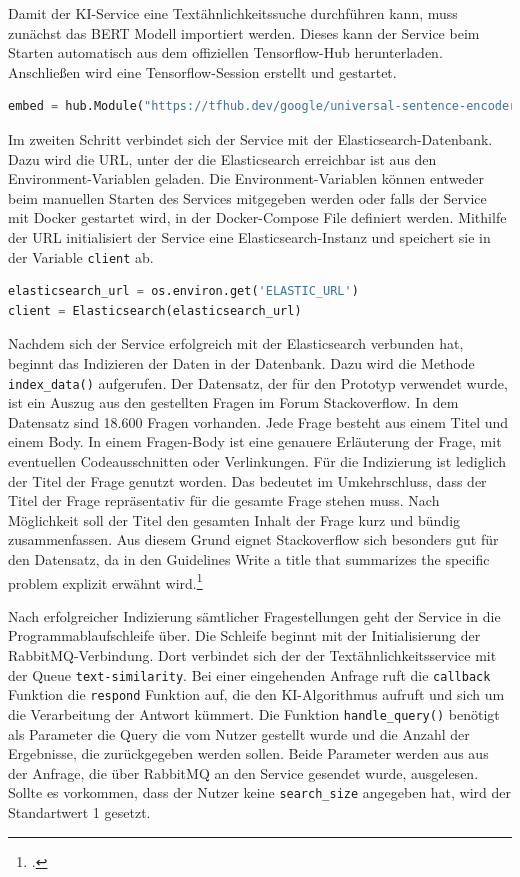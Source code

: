 Damit der KI-Service eine Textähnlichkeitssuche durchführen kann, muss zunächst das BERT Modell importiert werden. Dieses kann der Service beim Starten automatisch aus dem offiziellen Tensorflow-Hub herunterladen. Anschließen wird eine Tensorflow-Session erstellt und gestartet. 

\begin{lstlisting}[language=Python, caption={Laden des BERT-Modells}]
embed = hub.Module("https://tfhub.dev/google/universal-sentence-encoder/2")
\end{lstlisting}

Im zweiten Schritt verbindet sich der Service mit der Elasticsearch-Datenbank. Dazu wird die URL, unter der die Elasticsearch erreichbar ist aus den Environment-Variablen geladen. Die Environment-Variablen können entweder beim manuellen Starten des Services mitgegeben werden oder falls der Service mit Docker gestartet wird, in der Docker-Compose File definiert werden. Mithilfe der URL initialisiert der Service eine Elasticsearch-Instanz und speichert sie in der Variable \texttt{client} ab. 

\begin{lstlisting}[language=Python, caption={Starten der Elasticsearch-Instanz}]
elasticsearch_url = os.environ.get('ELASTIC_URL')
client = Elasticsearch(elasticsearch_url)
\end{lstlisting}

Nachdem sich der Service erfolgreich mit der Elasticsearch verbunden hat, beginnt das Indizieren der Daten in der Datenbank. Dazu wird die Methode \texttt{index\_{}data()} aufgerufen. Der Datensatz, der für den Prototyp verwendet wurde, ist ein Auszug aus den gestellten Fragen im Forum Stackoverflow. In dem Datensatz sind 18.600 Fragen vorhanden. Jede Frage besteht aus einem Titel und einem Body. In einem Fragen-Body ist eine genauere Erläuterung der Frage, mit eventuellen Codeausschnitten oder Verlinkungen. Für die Indizierung ist lediglich der Titel der Frage genutzt worden. Das bedeutet im Umkehrschluss, dass der Titel der Frage repräsentativ für die gesamte Frage stehen muss. Nach Möglichkeit soll der Titel den gesamten Inhalt der Frage kurz und bündig zusammenfassen. Aus diesem Grund eignet Stackoverflow sich besonders gut für den Datensatz, da in den Guidelines \glqq Write a title that summarizes the specific problem\grqq{} explizit erwähnt wird.\footcite{stackoverflow2022question}

Nach erfolgreicher Indizierung sämtlicher Fragestellungen geht der Service in die Programmablaufschleife über. Die Schleife beginnt mit der Initialisierung der RabbitMQ-Verbindung. Dort verbindet sich der der Textähnlichkeitsservice mit der Queue \texttt{text-similarity}. Bei einer eingehenden Anfrage ruft die \texttt{callback} Funktion die \texttt{respond} Funktion auf, die den KI-Algorithmus aufruft und sich um die Verarbeitung der Antwort kümmert. Die Funktion \texttt{handle\_{}query()} benötigt als Parameter die Query die vom Nutzer gestellt wurde und die Anzahl der Ergebnisse, die zurückgegeben werden sollen. Beide Parameter werden aus aus der Anfrage, die über RabbitMQ an den Service gesendet wurde, ausgelesen. Sollte es vorkommen, dass der Nutzer keine \texttt{search\_{}size} angegeben hat, wird der Standartwert 1 gesetzt.
 
